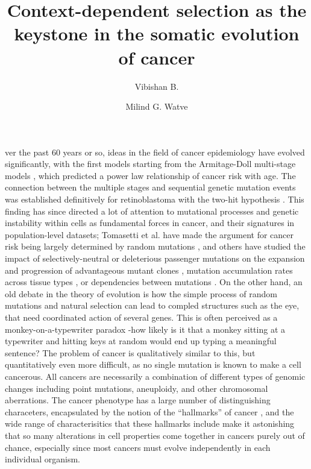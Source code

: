 \documentclass[9pt,twocolumn,twoside]{pnas-new}
\title{Context-dependent selection as the keystone in the somatic evolution of cancer}
\author[1,2]{Vibishan B.}
\author[1,2,*]{Milind G. Watve}
\affil[1]{Department of Biology, Indian Institute of Science Education and Research (IISER), Pune}
\begin{document}
\maketitle
\thispagestyle{firststyle}

ver the past 60 years or so, ideas in the field of cancer epidemiology have evolved significantly, with the first models starting from the Armitage-Doll multi-stage models \cite{ARMITAGE1954}, which predicted a power law relationship of cancer risk with age. The connection between the multiple stages and sequential genetic mutation events was established definitively for retinoblastoma with the two-hit hypothesis \cite{Knudson1971}. This finding has since directed a lot of attention to mutational processes and genetic instability within cells as fundamental forces in cancer, and their signatures in population-level datasets; Tomasetti et al. have made the argument for cancer risk being largely determined by random mutations \cite{Tomasetti78, Tomasetti2017}, and others have studied the impact of selectively-neutral or deleterious passenger mutations on the expansion and progression of advantageous mutant clones \cite{McFarland2013}, mutation accumulation rates across tissue types \cite{Blokzijl2016}, or dependencies between mutations \cite{Mina2017}. On the other hand, an old debate in the theory of evolution is how the simple process of random mutations and natural selection can lead to compled structures such as the eye, that need coordinated action of several genes. This is often perceived as a monkey-on-a-typewriter paradox \cite{Dawkins1996}-how likely is it that a monkey sitting at a typewriter and hitting keys at random would end up typing a meaningful sentence? The problem of cancer is qualitatively similar to this, but quantitatively even more difficult, as no single mutation is known to make a cell cancerous. All cancers are necessarily a combination of different types of genomic changes including point mutations, aneuploidy, and other chromosomal aberrations. The cancer phenotype has a large number of distinguishing characeters, encapsulated by the notion of the ``hallmarks'' of cancer \cite{Hanahan2000, Schafer2008, Hanahan2011}, and the wide range of characterisitics that these hallmarks include make it astonishing that so many alterations in cell properties come together in cancers purely out of chance, especially since most cancers must evolve independently in each individual organism.
\end{document}
